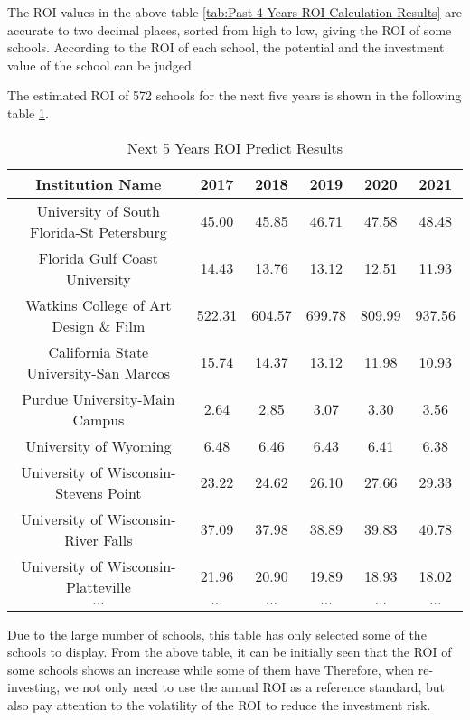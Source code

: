 \documentclass{mcmthesis}
\begin{document}
\newpage

\par The ROI values in the above table \ref{tab:Past 4 Years ROI Calculation Results} are accurate to two decimal places, sorted from high to low, giving the ROI of some schools. According to the ROI of each school, the potential and the investment value of the school can be judged.

\par The estimated ROI of 572 schools for the next five years is shown in the following table \ref{tab:Next 5 Years ROI Predict Results}.
\begin{table}[h]
\centering
\caption{Next 5 Years ROI Predict Results}
\label{tab:Next 5 Years ROI Predict Results}
\begin{tabular}{cccccc}
\toprule
Institution Name & 2017 & 2018 & 2019 & 2020 & 2021\\
\midrule
University of South Florida-St Petersburg	&45.00	&45.85	&46.71	&47.58	&48.48\\
Florida Gulf Coast University	&14.43	&13.76	&13.12	&12.51	&11.93\\
Watkins College of Art Design \& Film	&522.31	&604.57	&699.78	&809.99	&937.56\\
California State University-San Marcos	&15.74	&14.37	&13.12	&11.98	&10.93\\
Purdue University-Main Campus	&2.64	&2.85	&3.07	&3.30	&3.56\\
University of Wyoming	&6.48	&6.46	&6.43	&6.41	&6.38\\
University of Wisconsin-Stevens Point	&23.22	&24.62	&26.10	&27.66	&29.33\\
University of Wisconsin-River Falls	&37.09	&37.98	&38.89	&39.83	&40.78\\
University of Wisconsin-Platteville	&21.96	&20.90	&19.89	&18.93	&18.02\\
$\cdots$&$\cdots$&$\cdots$&$\cdots$&$\cdots$&$\cdots$\\
\bottomrule
\end{tabular}
\end{table}

\par Due to the large number of schools, this table has only selected some of the schools to display. From the above table, it can be initially seen that the ROI of some schools shows an increase while some of them have Therefore, when re-investing, we not only need to use the annual ROI as a reference standard, but also pay attention to the volatility of the ROI to reduce the investment risk.
\end{document}
